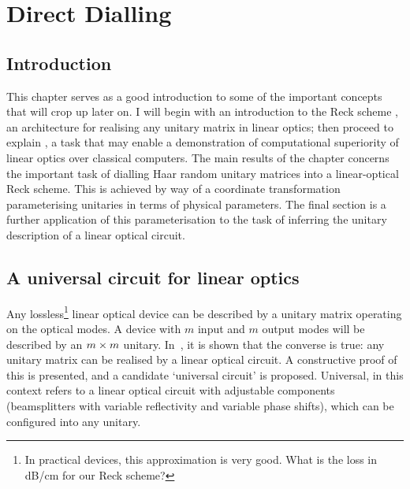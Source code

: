\chapter{Direct Dialling}
\label{ch:DirectDialling}

\section{Introduction}
\label{sec:DDIntro}
This chapter serves as a good introduction to some of the important concepts
that will crop up later on. I will begin with an introduction to the Reck
scheme \cite{reck94}, an architecture for realising any unitary matrix in linear
optics; then proceed to explain \bosonsampling \cite{bosonsampling}, a task that
may enable a demonstration of computational superiority of linear optics over
classical computers. The main results of the chapter concerns the important task
of dialling Haar random unitary matrices into a linear-optical Reck scheme. This
is achieved by way of a coordinate transformation parameterising unitaries in
terms of physical parameters. The final section is a further application of this
parameterisation to the task of inferring the unitary description of a linear
optical circuit.

\section{A universal circuit for linear optics}
\label{sec:ReckScheme}
Any lossless\footnote{In practical devices, this approximation is very good.
What is the loss in dB/cm for our Reck scheme?} linear optical device can be
described by a unitary matrix operating on the optical modes. A device with
\(m\) input and \(m\) output modes will be described by an \(m \times m\) unitary.
In~\cite{reck94}, it is shown that the converse is true: any unitary matrix can
be realised by a linear optical circuit. A constructive proof of this is
presented, and a candidate `universal circuit' is proposed. Universal, in this
context refers to a linear optical circuit with adjustable components
(beamsplitters with variable reflectivity and variable phase shifts), which can
be configured into any unitary.

